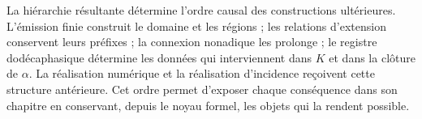 La hiérarchie résultante détermine l'ordre causal des constructions ultérieures.
L'émission finie construit le domaine et les régions ; les relations d'extension conservent leurs préfixes ; la connexion nonadique les prolonge ; le registre dodécaphasique détermine les données qui interviennent dans \(K\) et dans la clôture de \(\alpha\). La réalisation numérique et la réalisation d'incidence reçoivent cette structure antérieure. Cet ordre permet d'exposer chaque conséquence dans son chapitre en conservant, depuis le noyau formel, les objets qui la rendent possible.
